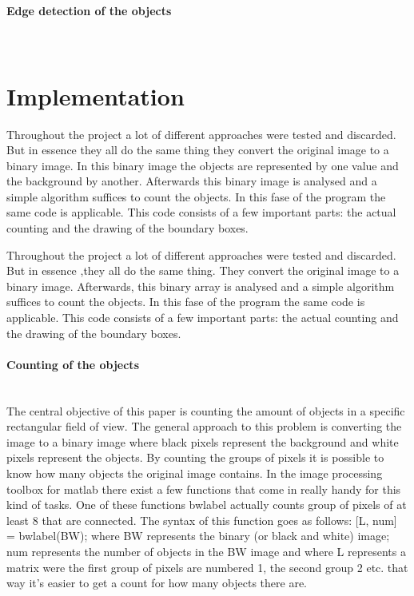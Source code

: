 \documentclass[11pt]{article}
\begin{document}
\paragraph{Edge detection of the objects}\mbox{}\\

\section{Implementation}
Throughout the project a lot of different approaches were tested and discarded. But in essence they all do the same thing they convert the original image to a binary image. In this binary image the objects are represented by one value and the background by another. Afterwards this binary image is analysed and a simple algorithm suffices to count the objects. In this fase of the program the same code is applicable. This code consists of a few important parts: the actual counting and the drawing of the boundary boxes. 

Throughout the project a lot of different approaches were tested and discarded. But in essence ,they all do the same thing. They convert the original image to a binary image. Afterwards, this binary array is analysed and a simple algorithm suffices to count the objects. In this fase of the program the same code is applicable. This code consists of a few important parts: the actual counting and the drawing of the boundary boxes. 
\paragraph{Counting of the objects}\mbox{}\\
The central objective of this paper is counting the amount of objects in a specific rectangular field of view. The general approach to this problem is converting the image to a binary image where black pixels represent the background and white pixels represent the objects. By counting the groups of pixels it is possible to know how many objects the original image contains. In the image processing toolbox for matlab there exist a few functions that come in really handy for this kind of tasks. One of these functions bwlabel actually counts group of pixels of at least 8 that are connected. The syntax of this function goes as follows: [L, num] = bwlabel(BW); where BW represents the binary (or black and white) image; num represents the number of objects in the BW image and where L represents a matrix were the first group of pixels are numbered 1, the second group 2 etc. that way it's easier to get a count for how many objects there are.
\end{document}
